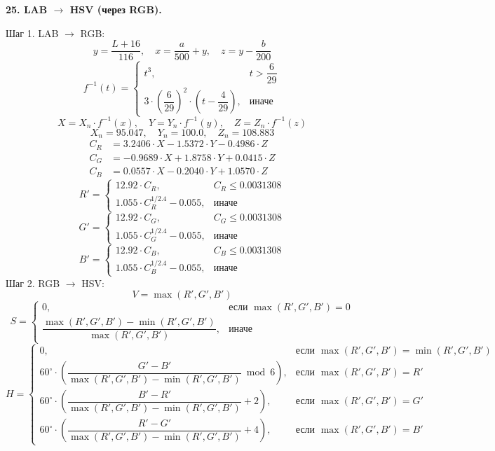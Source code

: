 \documentclass[12pt,a4paper]{article}
\begin{document}
\textbf{25. LAB \(\to\) HSV (через RGB).}

Шаг 1. LAB \(\to\) RGB:
\[
y = \frac{L + 16}{116},\quad x = \frac{a}{500} + y,\quad z = y - \frac{b}{200}
\]
\[
f^{-1}(t) = \begin{cases} t^3, & t > \dfrac{6}{29} \\[8pt] 3 \cdot \left( \dfrac{6}{29} \right)^2 \cdot \left( t - \dfrac{4}{29} \right), & \text{иначе} \end{cases}
\]
\[
X = X_n \cdot f^{-1}(x),\quad Y = Y_n \cdot f^{-1}(y),\quad Z = Z_n \cdot f^{-1}(z)
\]
\[
X_n = 95.047,\quad Y_n = 100.0,\quad Z_n = 108.883
\]
\begin{align*}
C_R &= 3.2406 \cdot X - 1.5372 \cdot Y - 0.4986 \cdot Z \\
C_G &= -0.9689 \cdot X + 1.8758 \cdot Y + 0.0415 \cdot Z \\
C_B &= 0.0557 \cdot X - 0.2040 \cdot Y + 1.0570 \cdot Z
\end{align*}
\[
R' = \begin{cases} 12.92 \cdot C_R, & C_R \le 0.0031308 \\[8pt] 1.055 \cdot C_R^{1/2.4} - 0.055, & \text{иначе} \end{cases}
\]
\[
G' = \begin{cases} 12.92 \cdot C_G, & C_G \le 0.0031308 \\[8pt] 1.055 \cdot C_G^{1/2.4} - 0.055, & \text{иначе} \end{cases}
\]
\[
B' = \begin{cases} 12.92 \cdot C_B, & C_B \le 0.0031308 \\[8pt] 1.055 \cdot C_B^{1/2.4} - 0.055, & \text{иначе} \end{cases}
\]
Шаг 2. RGB \(\to\) HSV:
\[
V = \max(R', G', B')
\]
\[
S = \begin{cases}
0, & \text{если } \max(R', G', B') = 0 \\[8pt]
\dfrac{\max(R', G', B') - \min(R', G', B')}{\max(R', G', B')}, & \text{иначе}
\end{cases}
\]
\[
H = \begin{cases}
0, & \text{если } \max(R', G', B') = \min(R', G', B') \\[8pt]
60^\circ \cdot \left( \dfrac{G' - B'}{\max(R', G', B') - \min(R', G', B')} \bmod 6 \right), & \text{если } \max(R', G', B') = R' \\[12pt]
60^\circ \cdot \left( \dfrac{B' - R'}{\max(R', G', B') - \min(R', G', B')} + 2 \right), & \text{если } \max(R', G', B') = G' \\[12pt]
60^\circ \cdot \left( \dfrac{R' - G'}{\max(R', G', B') - \min(R', G', B')} + 4 \right), & \text{если } \max(R', G', B') = B'
\end{cases}
\]
\end{document}

